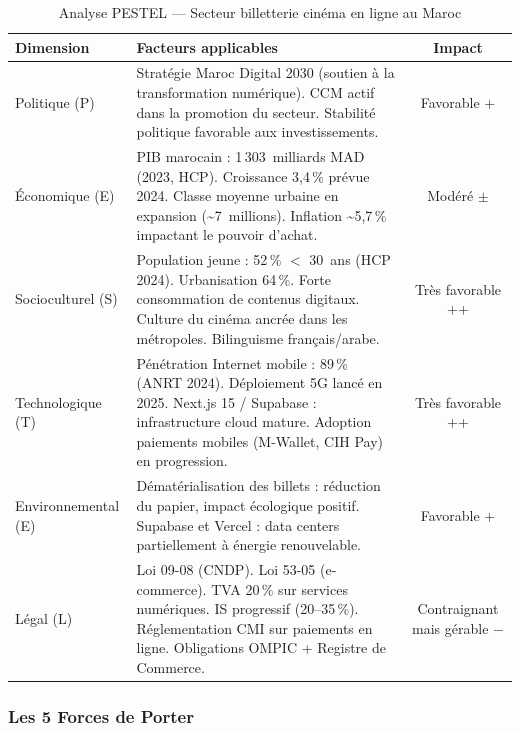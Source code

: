 \documentclass[12pt,a4paper,openany]{report}
\begin{document}
\begin{table}[H]
\centering
\small
\begin{tabularx}{\textwidth}{lXc}
\toprule
\textbf{Dimension} & \textbf{Facteurs applicables} & \textbf{Impact} \\
\midrule
Politique (P)      & Stratégie Maroc Digital 2030 (soutien à la transformation numérique). CCM actif dans la promotion du secteur. Stabilité politique favorable aux investissements. & Favorable + \\
\midrule
Économique (E)     & PIB marocain : 1\,303~milliards MAD (2023, HCP). Croissance 3,4\,\% prévue 2024. Classe moyenne urbaine en expansion (\textasciitilde{}7~millions). Inflation \textasciitilde{}5,7\,\% impactant le pouvoir d'achat. & Modéré $\pm$ \\
\midrule
Socioculturel (S)  & Population jeune : 52\,\% $<$ 30~ans (HCP 2024). Urbanisation 64\,\%. Forte consommation de contenus digitaux. Culture du cinéma ancrée dans les métropoles. Bilinguisme français/arabe. & Très favorable ++ \\
\midrule
Technologique (T)  & Pénétration Internet mobile : 89\,\% (ANRT 2024). Déploiement 5G lancé en 2025. Next.js 15 / Supabase : infrastructure cloud mature. Adoption paiements mobiles (M-Wallet, CIH Pay) en progression. & Très favorable ++ \\
\midrule
Environnemental (E)& Dématérialisation des billets : réduction du papier, impact écologique positif. Supabase et Vercel : data centers partiellement à énergie renouvelable. & Favorable + \\
\midrule
Légal (L)          & Loi 09-08 (CNDP). Loi 53-05 (e-commerce). TVA 20\,\% sur services numériques. IS progressif (20–35\,\%). Réglementation CMI sur paiements en ligne. Obligations OMPIC + Registre de Commerce. & Contraignant mais gérable $-$ \\
\bottomrule
\end{tabularx}
\caption{Analyse PESTEL — Secteur billetterie cinéma en ligne au Maroc}
\label{tab:pestel}
\end{table}

\subsubsection{Les 5 Forces de Porter}
\end{document}
